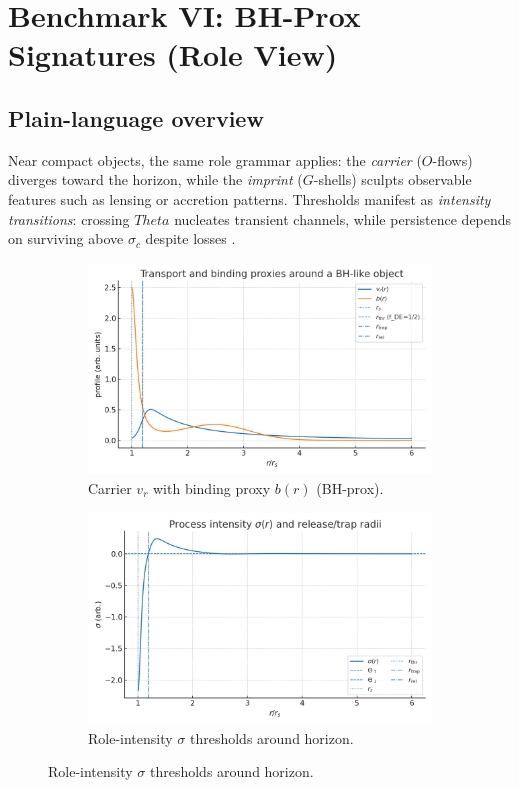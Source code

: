 \documentclass[12pt,a4paper,oneside]{scrreprt}
\def\Theta{Theta}%
\begin{document}
\chapter{Benchmark VI: BH-Prox Signatures (Role View)}
\section*{Plain-language overview}
Near compact objects, the same role grammar applies: the \emph{carrier} ($O$-flows) diverges toward the horizon, while the \emph{imprint} ($G$-shells) sculpts observable features such as lensing or accretion patterns.  
Thresholds manifest as \emph{intensity transitions}: crossing $\Theta$ nucleates transient channels, while persistence depends on surviving above $\sigma_c$ despite losses \cite{Cardoso2016,Barack2019,Maggio2020}.

\begin{figure}[htbp]\centering
  \begin{subfigure}[t]{0.49\linewidth}
    \includegraphics[width=\linewidth]{bh_profiles_vr_b.png}
    \caption{Carrier $v_r$ with binding proxy $b(r)$ (BH-prox).}
    \label{fig:bh:profiles}
  \end{subfigure}\hfill
  \begin{subfigure}[t]{0.49\linewidth}
    \includegraphics[width=\linewidth]{bh_sigma_thresholds.png}
    \caption{Role-intensity $\sigma$ thresholds around horizon.}
    \label{fig:bh:sigma}
  \end{subfigure}
\end{figure}
\end{document}
